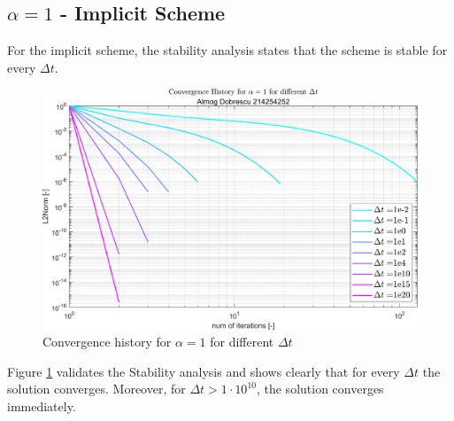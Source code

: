 \documentclass[11pt, a4paper]{article}
\begin{document}
\subsection{$\alpha = 1$ - Implicit Scheme}
For the implicit scheme, the stability analysis states that the scheme is stable for every $\Delta t$.
\begin{figure}[H]
    \centering
    \includegraphics[width=.8\textwidth]{images/grap7.png}
    \caption{Convergence history for $\alpha=1$ for different $\Delta t$}
    \label{fig6}
\end{figure}
\noindent Figure \ref{fig6} validates the Stability analysis and shows clearly that for every $\Delta t$ the solution converges. Moreover, for $\Delta t>1\cdot10^{10}$, the solution converges immediately.
\end{document}
